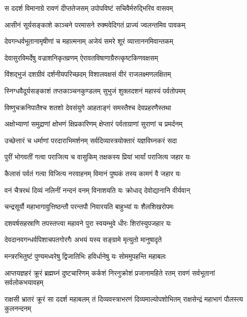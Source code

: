 \twolineshloka
{स ददर्श विमानाग्रे रावणं दीप्ततेजसम्}
{उपोपविष्टं सचिवैर्मरुद्भिरिव वासवम्} %

\twolineshloka
{आसीनं सूर्यसङ्काशे काञ्चने परमासने}
{रुक्मवेदिगतं प्राज्यं ज्वलन्तमिव पावकम्} %

\twolineshloka
{देवगन्धर्वभूतानामृषीणां च महात्मनाम्}
{अजेयं समरे शूरं व्यात्ताननमिवान्तकम्} %

\twolineshloka
{देवासुरविमर्देषु वज्राशनिकृतव्रणम्}
{ऐरावतविषाणाग्रैरुत्कृष्टकिणवक्षसम्} %

\twolineshloka
{विंशद्भुजं दशग्रीवं दर्शनीयपरिच्छदम्}
{विशालवक्षसं वीरं राजलक्ष्मणलक्षितम्} %

\twolineshloka
{स्निग्धवैदूर्यसङ्काशं तप्तकाञ्चनकुण्डलम्}
{सुभुजं शुक्लदशनं महास्यं पर्वतोपमम्} %

\twolineshloka
{विष्णुचक्रनिपातैश्च शतशो देवसंयुगे}
{आहताङ्गं समस्तैश्च देवप्रहरणैस्तथा} %

\twolineshloka
{अक्षोभ्याणां समुद्राणां क्षोभणं क्षिप्रकारिणम्}
{क्षेप्तारं पर्वताग्राणां सुराणां च प्रमर्दनम्} %

\twolineshloka
{उच्छेत्तारं च धर्माणां परदाराभिमर्शनम्}
{सर्वदिव्यास्त्रयोक्तारं यज्ञविघ्नकरं सदा} %

\twolineshloka
{पुरीं भोगवतीं गत्वा पराजित्य च वासुकिम्}
{तक्षकस्य प्रियां भार्यां पराजित्य जहार यः} %

\twolineshloka
{कैलासं पर्वतं गत्वा विजित्य नरवाहनम्}
{विमानं पुष्पकं तस्य कामगं वै जहार यः} %

\twolineshloka
{वनं चैत्ररथं दिव्यं नलिनीं नन्दनं वनम्}
{विनाशयति यः क्रोधाद् देवोद्यानानि वीर्यवान्} %

\twolineshloka
{चन्द्रसूर्यौ महाभागावुत्तिष्ठन्तौ परन्तपौ}
{निवारयति बाहुभ्यां यः शैलशिखरोपमः} %

\twolineshloka
{दशवर्षसहस्राणि तपस्तप्त्वा महावने}
{पुरा स्वयम्भुवे धीरः शिरांस्युपजहार यः} %

\twolineshloka
{देवदानवगन्धर्वपिशाचपतगोरगैः}
{अभयं यस्य सङ्ग्रामे मृत्युतो मानुषादृते} %

\twolineshloka
{मन्त्ररभितुष्टं पुण्यमध्वरेषु द्विजातिभिः}
{हविर्धानेषु यः सोममुपहन्ति महाबलः} %

\threelineshloka
{आप्तयज्ञहरं क्रूरं ब्रह्मघ्नं दुष्टचारिणम्}
{कर्कशं निरनुक्रोशं प्रजानामहिते रतम्}
{रावणं सर्वभूतानां सर्वलोकभयावहम्} %

\threelineshloka
{राक्षसी भ्रातरं क्रूरं सा ददर्श महाबलम्}
{तं दिव्यवस्त्राभरणं दिव्यमाल्योपशोभितम्}
{राक्षसेन्द्रं महाभागं पौलस्त्य कुलनन्दनम्} %

